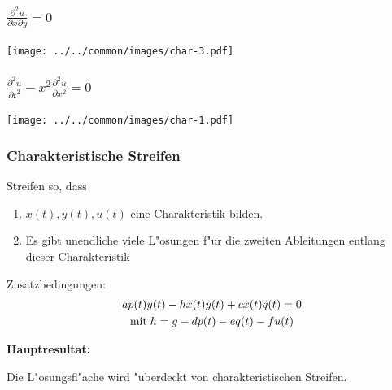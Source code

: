 \begin{frame}
\frametitle{$\displaystyle \frac{\partial^2 u}{\partial x\partial y}=0$}
\pause
\begin{center}
\texttt{[image: ../../common/images/char-3.pdf]}
\end{center}
\end{frame}

\begin{frame}
\frametitle{$\displaystyle \frac{\partial^2u}{\partial t^2}-x^2\frac{\partial^2 u}{\partial x^2}=0$}
\pause
\begin{center}
\texttt{[image: ../../common/images/char-1.pdf]}
\end{center}
\end{frame}

\begin{frame}
\frametitle{Charakteristische Streifen}
Streifen so, dass
\begin{enumerate}
\item
$x(t), y(t), u(t)$ eine Charakteristik bilden.
\item
Es gibt unendliche viele L"osungen f"ur die zweiten Ableitungen entlang
dieser Charakteristik
\end{enumerate}

Zusatzbedingungen:
\begin{gather*}
a\dot p(t)\dot y(t)
-
h \dot x(t) \dot y(t)
+
c \dot x(t)\dot q(t)=0
\\
\text{mit\;}
h=g-dp(t)-eq(t)-fu(t)
\end{gather*}

\bigskip

{\bf Hauptresultat:}
\medskip

\begin{theorem}
Die L"osungsfl"ache wird "uberdeckt von charakteristischen Streifen.
\end{theorem}

\end{frame}

